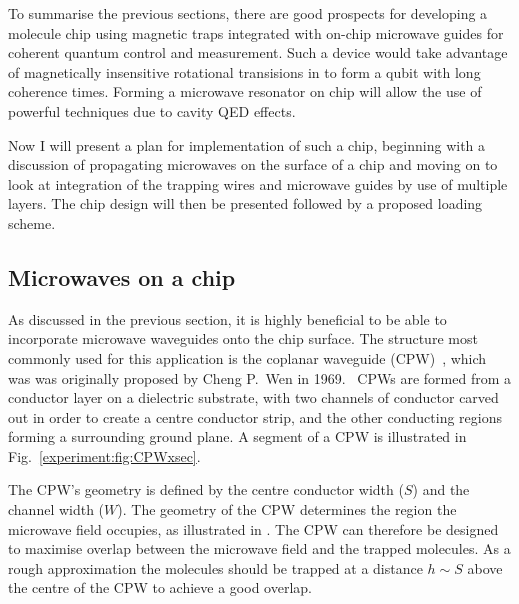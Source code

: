 To summarise the previous sections, there are good prospects for developing a
molecule chip using magnetic traps integrated with on-chip microwave guides for
coherent quantum control and measurement. Such a device would take advantage of
magnetically insensitive rotational transisions in \CaF{} to form a qubit with
long coherence times. Forming a microwave resonator on chip will allow the use
of powerful techniques due to cavity QED effects.


Now I will present a plan for implementation of such a chip, beginning with a
discussion of propagating microwaves on the surface of a chip and moving on to
look at integration of the trapping wires and microwave guides by use of
multiple layers. The chip design will then be presented followed by a proposed
loading scheme.

\subsection{Microwaves on a chip}

As discussed in the previous section, it is highly beneficial to be able to
incorporate microwave waveguides onto the chip surface. The structure most
commonly used for this application is the coplanar waveguide
(CPW)~\cite{1127105, Simons2004}, which was was originally proposed by Cheng
P.~Wen in 1969.~\cite{1127105} CPWs are formed from a conductor layer on a
dielectric substrate, with two channels of conductor carved out in order to
create a centre conductor strip, and the other conducting regions forming a
surrounding ground plane.  A segment of a CPW is illustrated in
Fig.~\ref{experiment:fig:CPWxsec}.

%
The CPW's geometry is defined by the centre conductor width ($S$) and the
channel width ($W$). The geometry of the CPW determines the region the microwave
field occupies, as illustrated in . The CPW
can therefore be designed to maximise overlap between the microwave field and
the trapped molecules. As a rough approximation the molecules should be trapped
at a distance $h\sim S$ above the centre of the CPW to achieve a good
overlap.~\cite{Boehi2009}

